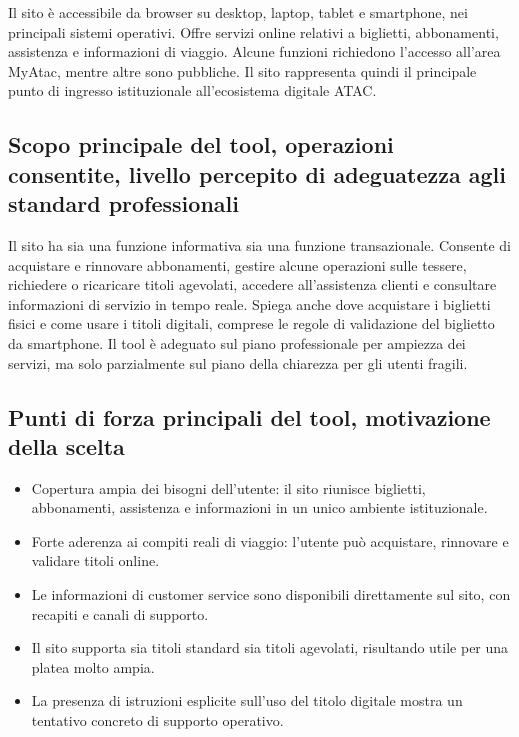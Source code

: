 \documentclass[11pt,a4paper]{article}
\begin{document}
\noindent Il sito è accessibile da browser su desktop, laptop, tablet e smartphone, nei principali sistemi operativi. Offre servizi online relativi a biglietti, abbonamenti, assistenza e informazioni di viaggio. Alcune funzioni richiedono l’accesso all’area MyAtac, mentre altre sono pubbliche. Il sito rappresenta quindi il principale punto di ingresso istituzionale all’ecosistema digitale ATAC.

\subsection*{Scopo principale del tool, operazioni consentite, livello percepito di adeguatezza agli standard professionali}

\noindent Il sito ha sia una funzione informativa sia una funzione transazionale. Consente di acquistare e rinnovare abbonamenti, gestire alcune operazioni sulle tessere, richiedere o ricaricare titoli agevolati, accedere all’assistenza clienti e consultare informazioni di servizio in tempo reale. Spiega anche dove acquistare i biglietti fisici e come usare i titoli digitali, comprese le regole di validazione del biglietto da smartphone. Il tool è adeguato sul piano professionale per ampiezza dei servizi, ma solo parzialmente sul piano della chiarezza per gli utenti fragili. 

\subsection*{Punti di forza principali del tool, motivazione della scelta}

\begin{itemize}
    \item Copertura ampia dei bisogni dell’utente: il sito riunisce biglietti, abbonamenti, assistenza e informazioni in un unico ambiente istituzionale.
    \item Forte aderenza ai compiti reali di viaggio: l’utente può acquistare, rinnovare e validare titoli online.
    \item Le informazioni di customer service sono disponibili direttamente sul sito, con recapiti e canali di supporto.
    \item Il sito supporta sia titoli standard sia titoli agevolati, risultando utile per una platea molto ampia.
    \item La presenza di istruzioni esplicite sull’uso del titolo digitale mostra un tentativo concreto di supporto operativo.
\end{itemize}
\end{document}
